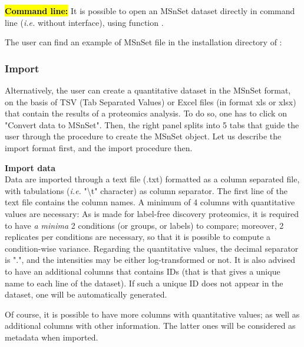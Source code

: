 \documentclass[12pt]{article}
\begin{document}
\hl{\bf Command line:} It is possible to open an MSnSet dataset directly in 
command line (\emph{i.e.} without  interface), using 
function .

{The user can find an example of MSnSet file in the installation directory 
of :\newline
{}}
% 


\subsubsection{Import}\label{sec:import}
Alternatively, the user can create a quantitative dataset in the MSnSet 
format, on the basis of TSV (Tab Separated Values) or Excel files (in format xls or xlsx) that 
contain the results of a proteomics analysis. To do so, one has to click 
on "Convert data to MSnSet". Then, the right panel splits into 5 tabs that 
guide the user through the procedure to create the MSnSet object. Let us describe the import format first, and the import procedure then. 

\noindent \textbf{Import data}\\
\noindent Data are imported through a text file (.txt) formatted as a column separated file, with tabulations (\textit{i.e.} "\textbackslash{}t" character) as column separator.
The first line of the text file contains the column names. A minimum of 4 columns with quantitative values are necessary: As  is made for label-free discovery proteomics, it is required to have \textit{a minima} 2 conditions (or groups, or labels) to compare; moreover, 2 replicates per conditions are necessary, so that it is possible to compute a condition-wise variance. Regarding the quantitative values, the decimal separator is ".", and the intensities may be either log-transformed or not. It is also advised to have an additional columns that contains IDs (that is that gives a unique name to each line of the dataset). If such a unique ID does not appear in the dataset, one will be automatically generated.

Of course, it is possible to have more columns with quantitative values; as well as additional columns with other information. The latter ones will be considered as metadata when imported.
\end{document}
